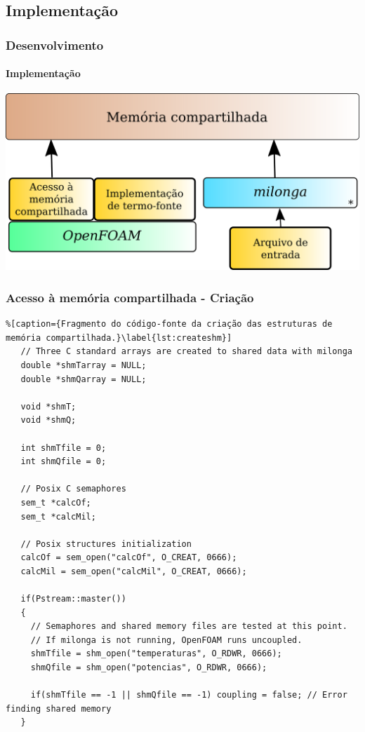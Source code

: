 \documentclass[svgnames,smaller,table]{beamer}
\begin{document}
\subsection{Implementação}
\begin{frame}
  \frametitle{Desenvolvimento}
  \framesubtitle{Implementação}
  \centering\includegraphics[scale=0.9]{../figuras/metod-2.png}
\end{frame}



\begin{frame}[fragile]
  \frametitle{Acesso à memória compartilhada - Criação}
 \begin{lstlisting}%[caption={Fragmento do código-fonte da criação das estruturas de memória compartilhada.}\label{lst:createshm}]
   // Three C standard arrays are created to shared data with milonga
   double *shmTarray = NULL;
   double *shmQarray = NULL;
   
   void *shmT;
   void *shmQ;

   int shmTfile = 0;
   int shmQfile = 0;
   
   // Posix C semaphores
   sem_t *calcOf;
   sem_t *calcMil;
   
   // Posix structures initialization
   calcOf = sem_open("calcOf", O_CREAT, 0666);
   calcMil = sem_open("calcMil", O_CREAT, 0666);
   
   if(Pstream::master())
   {
     // Semaphores and shared memory files are tested at this point.
     // If milonga is not running, OpenFOAM runs uncoupled.
     shmTfile = shm_open("temperaturas", O_RDWR, 0666);
     shmQfile = shm_open("potencias", O_RDWR, 0666);
    
     if(shmTfile == -1 || shmQfile == -1) coupling = false; // Error finding shared memory
   }
 \end{lstlisting}
\end{frame}
\end{document}
